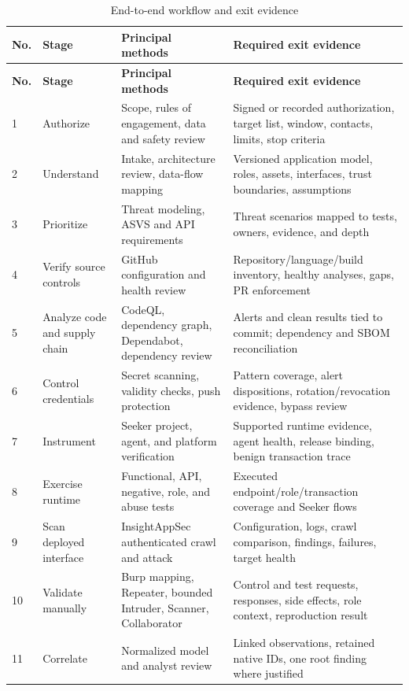 \documentclass[11pt,letterpaper]{article}
\begin{document}
\begin{longtable}{@{}C{0.34in}L{1.12in}L{2.0in}L{2.9in}@{}}
\caption{End-to-end workflow and exit evidence}\label{tab:integrated-workflow}\\
\toprule
\textbf{No.} & \textbf{Stage} & \textbf{Principal methods} & \textbf{Required exit evidence} \\
\midrule
\endfirsthead
\toprule
\textbf{No.} & \textbf{Stage} & \textbf{Principal methods} & \textbf{Required exit evidence} \\
\midrule
{} & Authorize & Scope, rules of engagement, data and safety review & Signed or recorded authorization, target list, window, contacts, limits, stop criteria \\
2 & Understand & Intake, architecture review, data-flow mapping & Versioned application model, roles, assets, interfaces, trust boundaries, assumptions \\
3 & Prioritize & Threat modeling, ASVS and API requirements & Threat scenarios mapped to tests, owners, evidence, and depth \\
4 & Verify source controls & GitHub configuration and health review & Repository/language/build inventory, healthy analyses, gaps, PR enforcement \\
5 & Analyze code and supply chain & CodeQL, dependency graph, Dependabot, dependency review & Alerts and clean results tied to commit; dependency and SBOM reconciliation \\
6 & Control credentials & Secret scanning, validity checks, push protection & Pattern coverage, alert dispositions, rotation/revocation evidence, bypass review \\
7 & Instrument & Seeker project, agent, and platform verification & Supported runtime evidence, agent health, release binding, benign transaction trace \\
8 & Exercise runtime & Functional, API, negative, role, and abuse tests & Executed endpoint/role/transaction coverage and Seeker flows \\
9 & Scan deployed interface & InsightAppSec authenticated crawl and attack & Configuration, logs, crawl comparison, findings, failures, target health \\
10 & Validate manually & Burp mapping, Repeater, bounded Intruder, Scanner, Collaborator & Control and test requests, responses, side effects, role context, reproduction result \\
11 & Correlate & Normalized model and analyst review & Linked observations, retained native IDs, one root finding where justified \\

\end{longtable}
\end{document}

